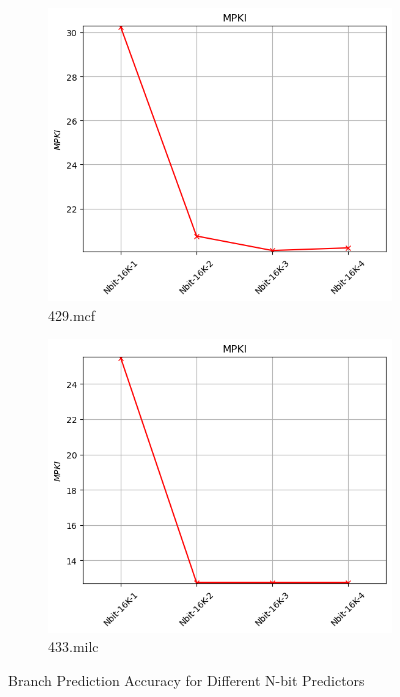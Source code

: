 \documentclass{article}
\begin{document}
\begin{figure}[H]
    \vspace{0.5cm} %

    \begin{subfigure}[b]{0.45\textwidth}
        \includegraphics[width=\textwidth]{figures/5_3/429.mcf.cslab_branch_preds_ref.out.png}
        \caption{429.mcf}
        \label{fig:plot5}
    \end{subfigure}
    \hfill
    \begin{subfigure}[b]{0.45\textwidth}
        \includegraphics[width=\textwidth]{figures/5_3/433.milc.cslab_branch_preds_ref.out.png}
        \caption{433.milc}
        \label{fig:plot6}
    \end{subfigure}
    \vspace{0.5cm} 

    \caption{Branch Prediction Accuracy for Different N-bit Predictors}
    \label{fig:all_plots}
\end{figure}
\end{document}
